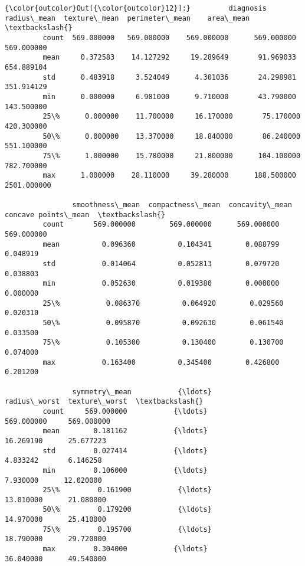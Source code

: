 \documentclass[11pt]{article}
\begin{document}
\begin{Verbatim}[commandchars=\\\{\}]
{\color{outcolor}Out[{\color{outcolor}12}]:}         diagnosis  radius\_mean  texture\_mean  perimeter\_mean    area\_mean  \textbackslash{}
         count  569.000000   569.000000    569.000000      569.000000   569.000000   
         mean     0.372583    14.127292     19.289649       91.969033   654.889104   
         std      0.483918     3.524049      4.301036       24.298981   351.914129   
         min      0.000000     6.981000      9.710000       43.790000   143.500000   
         25\%      0.000000    11.700000     16.170000       75.170000   420.300000   
         50\%      0.000000    13.370000     18.840000       86.240000   551.100000   
         75\%      1.000000    15.780000     21.800000      104.100000   782.700000   
         max      1.000000    28.110000     39.280000      188.500000  2501.000000   
         
                smoothness\_mean  compactness\_mean  concavity\_mean  concave points\_mean  \textbackslash{}
         count       569.000000        569.000000      569.000000           569.000000   
         mean          0.096360          0.104341        0.088799             0.048919   
         std           0.014064          0.052813        0.079720             0.038803   
         min           0.052630          0.019380        0.000000             0.000000   
         25\%           0.086370          0.064920        0.029560             0.020310   
         50\%           0.095870          0.092630        0.061540             0.033500   
         75\%           0.105300          0.130400        0.130700             0.074000   
         max           0.163400          0.345400        0.426800             0.201200   
         
                symmetry\_mean           {\ldots}             radius\_worst  texture\_worst  \textbackslash{}
         count     569.000000           {\ldots}               569.000000     569.000000   
         mean        0.181162           {\ldots}                16.269190      25.677223   
         std         0.027414           {\ldots}                 4.833242       6.146258   
         min         0.106000           {\ldots}                 7.930000      12.020000   
         25\%         0.161900           {\ldots}                13.010000      21.080000   
         50\%         0.179200           {\ldots}                14.970000      25.410000   
         75\%         0.195700           {\ldots}                18.790000      29.720000   
         max         0.304000           {\ldots}                36.040000      49.540000   
         

\end{Verbatim}
\end{document}

